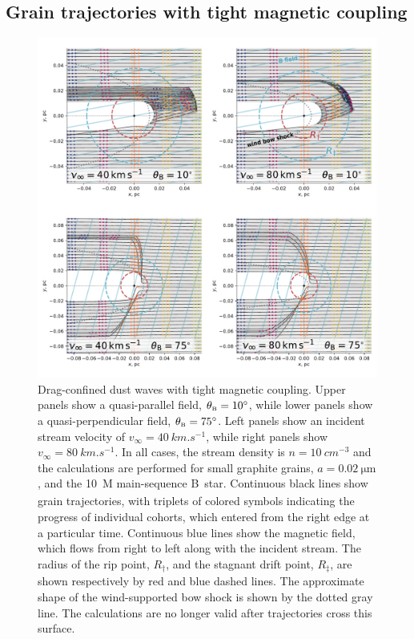 \subsection{Grain trajectories with tight magnetic coupling}
\label{sec:grain-traj-with}

\begin{figure}
  \centering
  \includegraphics[width=\linewidth]{figs/frozen-stream-map-multi}
  \caption{Drag-confined dust waves with tight magnetic coupling.
    Upper panels show a quasi-parallel field, \(\theta_{\scriptscriptstyle\text{B}} = \ang{10}\),
    while lower panels show a quasi-perpendicular field,
    \(\theta_{\scriptscriptstyle\text{B}} = \ang{75}\).  Left panels show an incident stream velocity of
    \(v_\infty = \SI{40}{km.s^{-1}}\), while right panels show
    \(v_\infty = \SI{80}{km.s^{-1}}\).  In all cases, the stream density is
    \(n = \SI{10}{cm^{-3}}\) and the calculations are performed for
    small graphite grains, \(a = \SI{0.02}{\um}\), and the
    \SI{10}{M_\odot} main-sequence B~star.  Continuous black lines show
    grain trajectories, with triplets of colored symbols indicating
    the progress of individual cohorts, which entered from the right
    edge at a particular time.  Continuous blue lines show the
    magnetic field, which flows from right to left along with the
    incident stream.  The radius of the rip point, \(R_\dag\), and the
    stagnant drift point, \(R_\ddag\), are shown respectively by red and
    blue dashed lines.  The approximate shape of the wind-supported
    bow shock is shown by the dotted gray line.  The calculations are
    no longer valid after trajectories cross this surface.}
  \label{fig:frozen-stream}
\end{figure}

